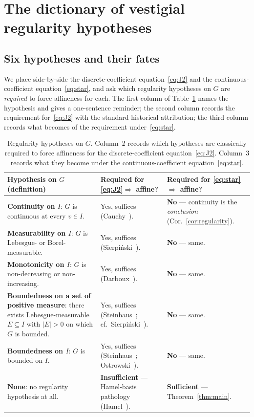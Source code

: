 \documentclass[review,12pt,a4paper]{elsarticle}
\theoremstyle{remark}
\begin{document}
\section{The dictionary of vestigial regularity hypotheses}
\label{sec:dictionary}

\subsection{Six hypotheses and their fates}

We place side-by-side the discrete-coefficient equation~\eqref{eq:J2} and
the continuous-coefficient equation~\eqref{eq:star}, and ask which
regularity hypotheses on $G$ are \emph{required} to force affineness for
each. The first column of Table~\ref{tab:dictionary} names the hypothesis
and gives a one-sentence reminder; the second column records the
requirement for~\eqref{eq:J2} with the standard historical attribution;
the third column records what becomes of the requirement
under~\eqref{eq:star}.

\begin{table}[ht]
\renewcommand{\arraystretch}{1.35}
\centering
\begin{tabularx}{\textwidth}{@{} X | X | X @{}}
\toprule
\textbf{Hypothesis on $G$ (definition)} &
\textbf{Required for \eqref{eq:J2}$\Rightarrow$ affine?} &
\textbf{Required for \eqref{eq:star}$\Rightarrow$ affine?}\\
\midrule
\textbf{Continuity on $I$}: $G$ is continuous at every $v\in I$.
& Yes, suffices (Cauchy~\cite{Cauchy1821}).
& \textbf{No} --- continuity is the \emph{conclusion} (Cor.~\ref{cor:regularity}).\\
\midrule
\textbf{Measurability on $I$}: $G$ is Lebesgue- or Borel-measurable.
& Yes, suffices (Sierpi\'nski~\cite{Sierpinski1920}).
& \textbf{No} --- same.\\
\midrule
\textbf{Monotonicity on $I$}: $G$ is non-decreasing or non-increasing.
& Yes, suffices (Darboux~\cite{Darboux1875}).
& \textbf{No} --- same.\\
\midrule
\textbf{Boundedness on a set of positive measure}: there exists
Lebesgue-measurable $E\subseteq I$ with $|E|>0$ on which $G$ is bounded.
& Yes, suffices (Steinhaus~\cite{Steinhaus1920}; cf.~Sierpi\'nski~\cite{Sierpinski1920}).
& \textbf{No} --- same.\\
\midrule
\textbf{Boundedness on $I$}: $G$ is bounded on $I$.
& Yes, suffices (Steinhaus~\cite{Steinhaus1920}; Ostrowski~\cite{Ostrowski1929}).
& \textbf{No} --- same.\\
\midrule
\textbf{None}: no regularity hypothesis at all.
& \textbf{Insufficient} --- Hamel-basis pathology (Hamel~\cite{Hamel1905}).
& \textbf{Sufficient} --- Theorem~\ref{thm:main}.\\
\bottomrule
\end{tabularx}
\caption{Regularity hypotheses on $G$. Column~2 records which hypotheses
are classically required to force affineness for the discrete-coefficient
equation~\eqref{eq:J2}. Column~3 records what they become under the
continuous-coefficient equation~\eqref{eq:star}.}
\label{tab:dictionary}
\end{table}
\end{document}
